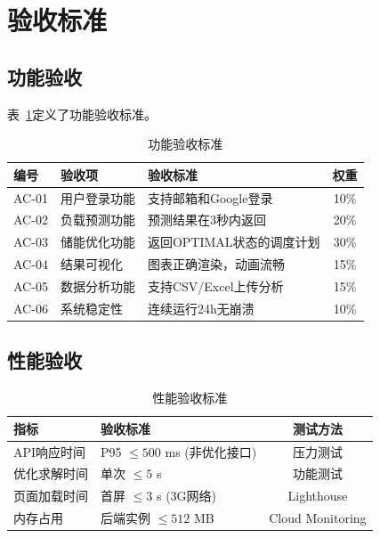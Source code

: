 \section{验收标准}

\subsection{功能验收}

表~\ref{tab:acceptance_func}定义了功能验收标准。

\begin{table}[htbp]
    \centering
    \caption{功能验收标准}
    \label{tab:acceptance_func}
    \begin{tabular}{lp{5cm}p{4cm}c}
        \toprule
        \textbf{编号} & \textbf{验收项} & \textbf{验收标准}    & \textbf{权重} \\
        \midrule
        AC-01       & 用户登录功能       & 支持邮箱和Google登录    & 10\%        \\
        AC-02       & 负载预测功能       & 预测结果在3秒内返回       & 20\%        \\
        AC-03       & 储能优化功能       & 返回OPTIMAL状态的调度计划 & 30\%        \\
        AC-04       & 结果可视化        & 图表正确渲染，动画流畅      & 15\%        \\
        AC-05       & 数据分析功能       & 支持CSV/Excel上传分析  & 15\%        \\
        AC-06       & 系统稳定性        & 连续运行24h无崩溃       & 10\%        \\
        \bottomrule
    \end{tabular}
\end{table}

\subsection{性能验收}

\begin{table}[htbp]
    \centering
    \caption{性能验收标准}
    \label{tab:acceptance_perf}
    \begin{tabular}{lp{5cm}c}
        \toprule
        \textbf{指标} & \textbf{验收标准}             & \textbf{测试方法}    \\
        \midrule
        API响应时间     & P95 $\leq 500$ ms (非优化接口) & 压力测试             \\
        优化求解时间      & 单次 $\leq 5$ s             & 功能测试             \\
        页面加载时间      & 首屏 $\leq 3$ s (3G网络)      & Lighthouse       \\
        内存占用        & 后端实例 $\leq 512$ MB        & Cloud Monitoring \\
        \bottomrule
    \end{tabular}
\end{table}

